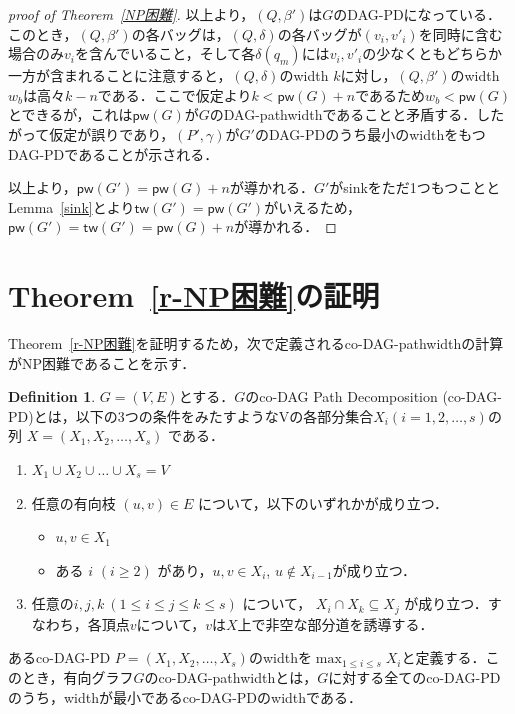 \documentclass[master]{kuisthesis}		%
\theoremstyle{plain}
\theoremstyle{definition}
\newtheorem{definition*}{Definition}
\begin{document}
\begin{proof}[proof of Theorem~\ref{NP困難}]
    以上より，$(Q, \beta')$は$G$のDAG-PDになっている．このとき，$(Q, \beta')$の各バッグは，$(Q, \delta)$の各バッグが$(v_i, v'_i)$を同時に含む場合のみ$v_i$を含んでいること，そして各$\delta(q_m)$には$v_i, v'_i$の少なくともどちらか一方が含まれることに注意すると，$(Q, \delta)$のwidth $k$に対し，$(Q, \beta')$のwidth $w_b$は高々$k - n$である．ここで仮定より$k < \mathsf{pw}(G) + n$であるため$w_b < \mathsf{pw}(G)$とできるが，これは$\mathsf{pw}(G)$が$G$のDAG-pathwidthであることと矛盾する．したがって仮定が誤りであり，$(P', \gamma)$が$G'$のDAG-PDのうち最小のwidthをもつDAG-PDであることが示される．
    
    以上より，$\mathsf{pw}(G') = \mathsf{pw}(G) + n$が導かれる．$G'$がsinkをただ1つもつこととLemma~\ref{sink}とより$\mathsf{tw}(G') = \mathsf{pw}(G')$がいえるため，$\mathsf{pw}(G') = \mathsf{tw}(G') = \mathsf{pw}(G) + n$が導かれる．
    
\end{proof}








\section{Theorem~\ref{r-NP困難}の証明}

Theorem~\ref{r-NP困難}を証明するため，次で定義されるco-DAG-pathwidthの計算がNP困難であることを示す．

\begin{definition*}
     $G=(V, E)$とする．$G$のco-DAG Path Decomposition (co-DAG-PD)とは，以下の3つの条件をみたすようなVの各部分集合$ X_i (i = 1, 2,  \ldots, s)$の列 $X=(X_1, X_2,  \ldots, X_s)$ である．

    \begin{enumerate}
        \item $ X_1 \cup X_2 \cup \dots \cup X_s = V $ 
        \item 任意の有向枝 $ (u, v) \in E $ について，以下のいずれかが成り立つ．
        \begin{itemize}
            \item $u, v \in X_1$
        \item ある $i$ $(i \geq 2)$ があり，$u, v \in X_i$, $u \notin X_{i-1}$が成り立つ．
        \end{itemize}
        \item 任意の$ i, j, k\ (1 \leq i \leq j \leq k \leq s)$ について， $X_i \cap X_k \subseteq X_j$ が成り立つ．すなわち，各頂点$v$について，$v$は$X$上で非空な部分道を誘導する．
    \end{enumerate}
    あるco-DAG-PD $P = (X_1, X_2,   \ldots, X_s)$のwidthを$\max_{1 \leq i \leq s} {X_i}$と定義する．このとき，有向グラフ$G$のco-DAG-pathwidthとは，$G$に対する全てのco-DAG-PDのうち，widthが最小であるco-DAG-PDのwidthである．
    
\end{definition*}
 
\end{document}
